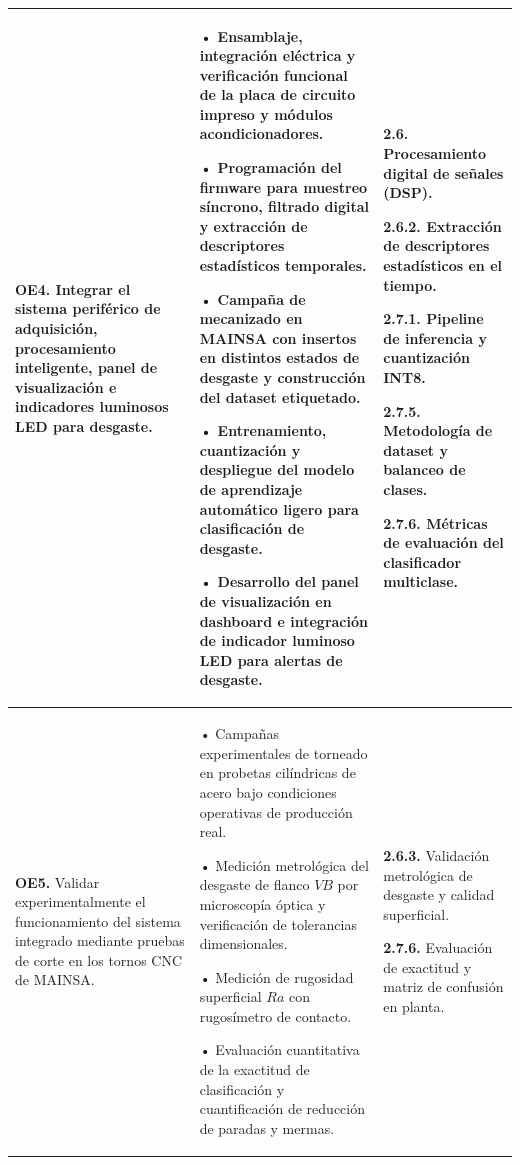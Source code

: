 {\begin{longtable}{>{\raggedright\arraybackslash}p{3.3cm}>{\raggedright\arraybackslash}p{5.2cm}>{\raggedright\arraybackslash}p{5.2cm}}
\textbf{OE4.} Integrar el sistema periférico de adquisición, procesamiento inteligente, panel de visualización e indicadores luminosos LED para desgaste. &
• Ensamblaje, integración eléctrica y verificación funcional de la placa de circuito impreso y módulos acondicionadores.\par\vspace{1mm}
• Programación del firmware para muestreo síncrono, filtrado digital y extracción de descriptores estadísticos temporales.\par\vspace{1mm}
• Campaña de mecanizado en MAINSA con insertos en distintos estados de desgaste y construcción del dataset etiquetado.\par\vspace{1mm}
• Entrenamiento, cuantización y despliegue del modelo de aprendizaje automático ligero para clasificación de desgaste.\par\vspace{1mm}
• Desarrollo del panel de visualización en dashboard e integración de indicador luminoso LED para alertas de desgaste. &
\textbf{2.6.} Procesamiento digital de señales (DSP).\par\vspace{1mm}
\textbf{2.6.2.} Extracción de descriptores estadísticos en el tiempo.\par\vspace{1mm}
\textbf{2.7.1.} Pipeline de inferencia y cuantización INT8.\par\vspace{1mm}
\textbf{2.7.5.} Metodología de dataset y balanceo de clases.\par\vspace{1mm}
\textbf{2.7.6.} Métricas de evaluación del clasificador multiclase. \\ \hline

\textbf{OE5.} Validar experimentalmente el funcionamiento del sistema integrado mediante pruebas de corte en los tornos CNC de MAINSA. &
• Campañas experimentales de torneado en probetas cilíndricas de acero bajo condiciones operativas de producción real.\par\vspace{1mm}
• Medición metrológica del desgaste de flanco $VB$ por microscopía óptica y verificación de tolerancias dimensionales.\par\vspace{1mm}
• Medición de rugosidad superficial $Ra$ con rugosímetro de contacto.\par\vspace{1mm}
• Evaluación cuantitativa de la exactitud de clasificación y cuantificación de reducción de paradas y mermas. &
\textbf{2.6.3.} Validación metrológica de desgaste y calidad superficial.\par\vspace{1mm}
\textbf{2.7.6.} Evaluación de exactitud y matriz de confusión en planta. \\ \hline

\end{longtable}
}


